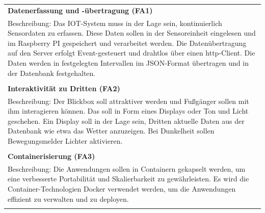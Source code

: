 \documentclass[
]{article}
\begin{document}
\begin{center}
  \begin{tabular}{|p{\linewidth}|}
    \hline
    \textbf{Datenerfassung und -übertragung (FA1)} \\
    Beschreibung: Das IOT-System muss in der Lage sein, kontinuierlich Sensordaten zu erfassen.
    Diese Daten sollen in der Sensoreinheit eingelesen und im Raspberry PI gespeichert und verarbeitet werden.
    Die Datenübertragung auf den Server erfolgt Event-gesteuert und drahtlos über einen http-Client.
    Die Daten werden in festgelegten Intervallen im JSON-Format übertragen und in der Datenbank festgehalten. \\ \\
    \hline
    \textbf{Interaktivität zu Dritten (FA2)} \\
    Beschreibung: Der Blickbox soll attraktiver werden und Fußgänger sollen mit ihm interagieren können.
    Das soll in Form eines Displays oder Ton und Licht geschehen.
    Ein Display soll in der Lage sein, Dritten aktuelle Daten aus der Datenbank wie etwa das Wetter anzuzeigen.
    Bei Dunkelheit sollen Bewegungsmelder Lichter aktivieren.\\ \\
    \hline
    \textbf{Containerisierung (FA3)} \\
    Beschreibung: Die Anwendungen sollen in Containern gekapselt werden, um eine verbesserte Portabilität und Skalierbarkeit zu gewährleisten.
    Es wird die Container-Technologien Docker verwendet werden, um die Anwendungen effizient zu verwalten und zu deployen. \\ \\
    \hline
  \end{tabular}
\end{center}
\end{document}
